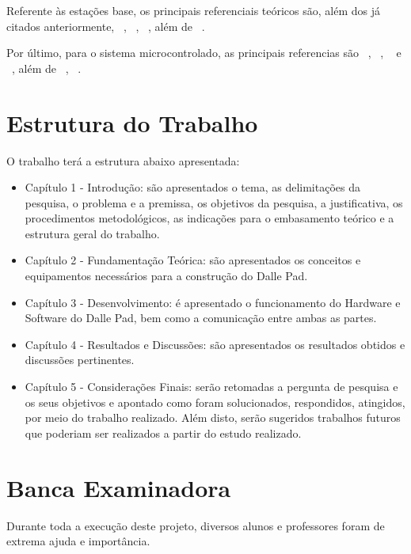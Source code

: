        Referente às estações base, os principais referenciais teóricos são, além dos já citados anteriormente, ~\cite{Ballou}, ~\cite{Gregoire}, ~\cite{Jackson}, além de ~\cite{AndroidDeveloper}.

        Por último, para o sistema microcontrolado, as principais referencias são ~\cite{Wheat}, ~\cite{Bayle}, ~\cite{Ghassaei} e ~\cite{Hass}, além de ~\cite{Arduino2014}, ~\cite{ArduinoRef2014}.

    \section{Estrutura do Trabalho}

        O trabalho terá a estrutura abaixo apresentada:

        \begin{itemize}
          \item Capítulo 1 - Introdução: são apresentados o tema, as delimitações da pesquisa, o problema e a premissa, os objetivos da pesquisa, a justificativa, os procedimentos metodológicos, as indicações para o embasamento teórico e a estrutura geral do trabalho.

          \item Capítulo 2 - Fundamentação Teórica: são apresentados os conceitos e equipamentos necessários para a construção do Dalle Pad.

          \item Capítulo 3 - Desenvolvimento: é apresentado o funcionamento do Hardware e Software do Dalle Pad, bem como a comunicação entre ambas as partes.

          \item Capítulo 4 - Resultados e Discussões: são apresentados os resultados obtidos e discussões pertinentes.

          \item Capítulo 5 - Considerações Finais: serão retomadas a pergunta de pesquisa e os seus objetivos e apontado como foram solucionados, respondidos, atingidos, por meio do trabalho realizado. Além disto, serão sugeridos trabalhos futuros que poderiam ser realizados a partir do estudo realizado.
        \end{itemize}

    \section {Banca Examinadora}

        Durante toda a execução deste projeto, diversos alunos e professores foram de extrema ajuda e importância.

